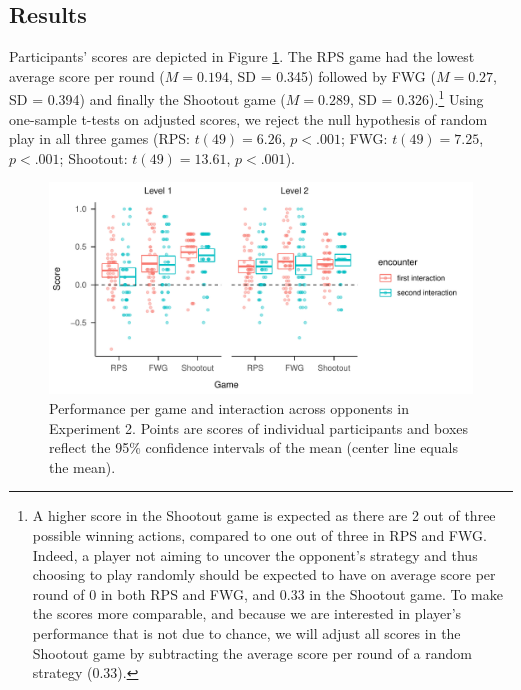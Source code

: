 \documentclass[smallextended]{svjour3}       %
\begin{document}
\hypertarget{results-1}{%
\subsection{Results}\label{results-1}}

Participants' scores are depicted in Figure \ref{fig:exp2-score-by-opp}.
The RPS game had the lowest average score per round (\(M = 0.194\), SD =
0.345) followed by FWG (\(M = 0.27\), SD = 0.394) and finally the
Shootout game (\(M = 0.289\), SD = 0.326).\footnote{A higher score in
  the Shootout game is expected as there are 2 out of three possible
  winning actions, compared to one out of three in RPS and FWG. Indeed,
  a player not aiming to uncover the opponent's strategy and thus
  choosing to play randomly should be expected to have on average score
  per round of 0 in both RPS and FWG, and 0.33 in the Shootout game. To
  make the scores more comparable, and because we are interested in
  player's performance that is not due to chance, we will adjust all
  scores in the Shootout game by subtracting the average score per round
  of a random strategy (0.33).} Using one-sample t-tests on adjusted
scores, we reject the null hypothesis of random play in all three games
(RPS: \(t(49) = 6.26\), \(p < .001\); FWG: \(t(49) = 7.25\),
\(p < .001\); Shootout: \(t(49) = 13.61\), \(p < .001\)).

\begin{figure}

{\centering \includegraphics[width=\textwidth]{CBB_files/figure-latex/exp2-score-by-opp-1} 

}

\caption{\label{fig:exp2-score-by-opp}Performance per game and interaction across opponents in Experiment 2. Points are scores of individual participants and boxes reflect the 95\% confidence intervals of the mean (center line equals the mean).}\label{fig:exp2-score-by-opp}
\end{figure}
\end{document}
